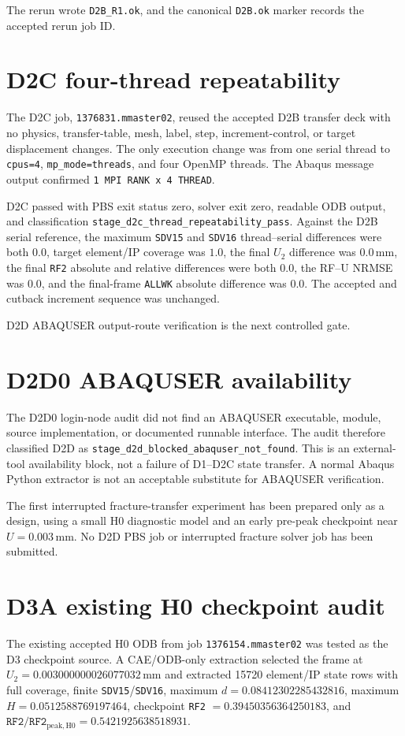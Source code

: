 The rerun wrote \texttt{D2B\_R1.ok}, and the canonical \texttt{D2B.ok} marker
records the accepted rerun job ID.

\section{D2C four-thread repeatability}
The D2C job, \texttt{1376831.mmaster02}, reused the accepted D2B transfer deck
with no physics, transfer-table, mesh, label, step, increment-control, or target
displacement changes. The only execution change was from one serial thread to
\texttt{cpus=4}, \texttt{mp\_mode=threads}, and four OpenMP threads. The Abaqus
message output confirmed \texttt{1 MPI RANK x 4 THREAD}.

D2C passed with PBS exit status zero, solver exit zero, readable ODB output, and
classification \texttt{stage\_d2c\_thread\_repeatability\_pass}. Against the
D2B serial reference, the maximum \texttt{SDV15} and \texttt{SDV16}
thread--serial differences were both $0.0$, target element/IP coverage was
$1.0$, the final $U_2$ difference was $0.0\,\mathrm{mm}$, the final
\texttt{RF2} absolute and relative differences were both $0.0$, the RF--U NRMSE
was $0.0$, and the final-frame \texttt{ALLWK} absolute difference was $0.0$.
The accepted and cutback increment sequence was unchanged.

D2D ABAQUSER output-route verification is the next controlled gate.

\section{D2D0 ABAQUSER availability}
The D2D0 login-node audit did not find an ABAQUSER executable, module, source
implementation, or documented runnable interface. The audit therefore classified
D2D as \texttt{stage\_d2d\_blocked\_abaquser\_not\_found}. This is an
external-tool availability block, not a failure of D1--D2C state transfer. A
normal Abaqus Python extractor is not an acceptable substitute for ABAQUSER
verification.

The first interrupted fracture-transfer experiment has been prepared only as a
design, using a small H0 diagnostic model and an early pre-peak checkpoint near
$U=0.003\,\mathrm{mm}$. No D2D PBS job or interrupted fracture solver job has
been submitted.

\section{D3A existing H0 checkpoint audit}
The existing accepted H0 ODB from job \texttt{1376154.mmaster02} was tested as
the D3 checkpoint source. A CAE/ODB-only extraction selected the frame at
$U_2=0.003000000026077032\,\mathrm{mm}$ and extracted 15720 element/IP state
rows with full coverage, finite \texttt{SDV15}/\texttt{SDV16}, maximum
$d=0.08412302285432816$, maximum $H=0.0512588769197464$, checkpoint
\texttt{RF2} $=0.39450356364250183$, and
$\mathtt{RF2}/\mathtt{RF2}_{\mathrm{peak,H0}}=0.5421925638518931$.

